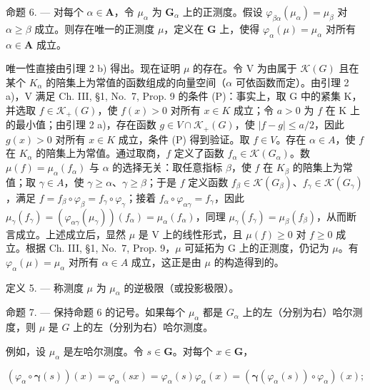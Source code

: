 命题 6. --- 对每个 \(\alpha \in \mathbf{A}\)，令 \(\mu_{\alpha}\) 为 \(\mathbf{G}_{\alpha}\) 上的正测度。假设 \(\varphi_{\beta \alpha}(\mu_{\alpha}) = \mu_{\beta}\) 对 \(\alpha \geqslant \beta\) 成立。则存在唯一的正测度 \(\mu\)，定义在 \(\mathbf{G}\) 上，使得 \(\varphi_{\alpha}(\mu) = \mu_{\alpha}\) 对所有 \(\alpha \in \mathbf{A}\) 成立。

唯一性直接由引理 2 b) 得出。现在证明 \(\mu\) 的存在。令 V 为由属于 \(\mathcal{K}(G)\) 且在某个 \(K_{\alpha}\) 的陪集上为常值的函数组成的向量空间（\(\alpha\) 可依函数而定）。由引理 2 a)，V 满足 Ch. III, §1, No.~7, Prop. 9 的条件 (P)：事实上，取 G 中的紧集 K，并选取 \(f \in \mathcal{K}_{+}(G)\)，使 \(f(x) > 0\) 对所有 \(x \in K\) 成立；令 \(a > 0\) 为 \(f\) 在 K 上的最小值；由引理 2 a)，存在函数 \(g \in V \cap \mathcal{K}_{+}(G)\)，使 \(|f - g| \leqslant a/2\)，因此 \(g(x) > 0\) 对所有 \(x \in K\) 成立，条件 (P) 得到验证。取 \(f \in V\)。存在 \(\alpha \in A\)，使 \(f\) 在 \(K_{\alpha}\) 的陪集上为常值。通过取商，\(f\) 定义了函数 \(f_{\alpha} \in \mathcal{K}(G_{\alpha})\)。数 \(\mu(f) = \mu_{\alpha}(f_{\alpha})\) 与 \(\alpha\) 的选择无关：取任意指标 \(\beta\)，使 \(f\) 在 \(K_{\beta}\) 的陪集上为常值；取 \(\gamma \in A\)，使 \(\gamma \geqslant \alpha\)、\(\gamma \geqslant \beta\)；于是 \(f\) 定义函数 \(f_{\beta} \in \mathcal{K}(G_{\beta})\)、\(f_{\gamma} \in \mathcal{K}(G_{\gamma})\)，满足 \(f = f_{\beta} \circ \varphi_{\beta} = f_{\gamma} \circ \varphi_{\gamma}\)；接着 \(f_{\alpha} \circ \varphi_{\alpha\gamma} = f_{\gamma}\)，因此 \(\mu_{\gamma}(f_{\gamma}) = (\varphi_{\alpha\gamma}(\mu_{\gamma}))(f_{\alpha}) = \mu_{\alpha}(f_{\alpha})\)，同理 \(\mu_{\gamma}(f_{\gamma}) = \mu_{\beta}(f_{\beta})\)，从而断言成立。上述成立后，显然 \(\mu\) 是 V 上的线性形式，且 \(\mu(f) \geqslant 0\) 对 \(f \geqslant 0\) 成立。根据 Ch. III, §1, No.~7, Prop. 9，\(\mu\) 可延拓为 G 上的正测度，仍记为 \(\mu\)。有 \(\varphi_{\alpha}(\mu) = \mu_{\alpha}\) 对所有 \(\alpha \in A\) 成立，这正是由 \(\mu\) 的构造得到的。

定义 5. --- 称测度 \(\mu\) 为 \(\mu_{\alpha}\) 的逆极限（或投影极限）。

命题 7. --- 保持命题 6 的记号。如果每个 \(\mu_{\alpha}\) 都是 \(G_{\alpha}\) 上的左（分别为右）哈尔测度，则 \(\mu\) 是 \(G\) 上的左（分别为右）哈尔测度。

例如，设 \(\mu_{\alpha}\) 是左哈尔测度。令 \(s \in \mathbf{G}\)。对每个 \(x \in \mathbf{G}\)，

\[
\left(\varphi_ {\alpha} \circ \boldsymbol {\gamma} (s)\right) (x) = \varphi_ {\alpha} (s x) = \varphi_ {\alpha} (s) \varphi_ {\alpha} (x) = \left(\boldsymbol {\gamma} (\varphi_ {\alpha} (s)) \circ \varphi_ {\alpha}\right) (x);
\]

